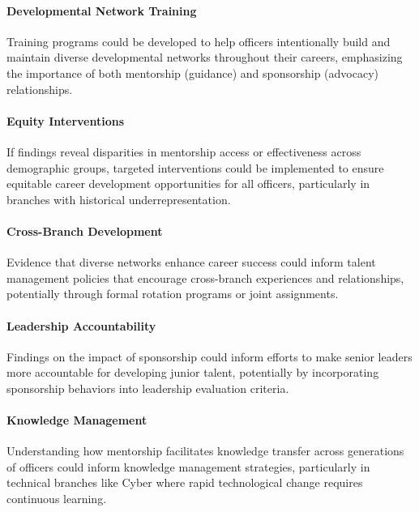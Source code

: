 \documentclass[main.tex]{subfiles}
\begin{document}
\paragraph{Developmental Network Training} Training programs could be developed to help officers intentionally build and maintain diverse developmental networks throughout their careers, emphasizing the importance of both mentorship (guidance) and sponsorship (advocacy) relationships.

\paragraph{Equity Interventions} If findings reveal disparities in mentorship access or effectiveness across demographic groups, targeted interventions could be implemented to ensure equitable career development opportunities for all officers, particularly in branches with historical underrepresentation.

\paragraph{Cross-Branch Development} Evidence that diverse networks enhance career success could inform talent management policies that encourage cross-branch experiences and relationships, potentially through formal rotation programs or joint assignments.

\paragraph{Leadership Accountability} Findings on the impact of sponsorship could inform efforts to make senior leaders more accountable for developing junior talent, potentially by incorporating sponsorship behaviors into leadership evaluation criteria.

\paragraph{Knowledge Management} Understanding how mentorship facilitates knowledge transfer across generations of officers could inform knowledge management strategies, particularly in technical branches like Cyber where rapid technological change requires continuous learning.
\end{document}
